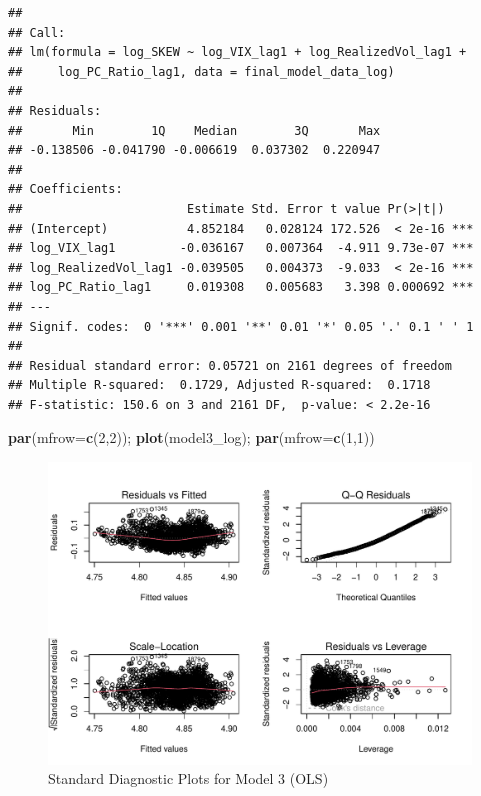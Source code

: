 \documentclass[
]{article}
\newenvironment{Shaded}{\begin{snugshade}}{\end{snugshade}}
\newcommand{\AttributeTok}[1]{\textcolor[rgb]{0.13,0.29,0.53}{#1}}
\newcommand{\DecValTok}[1]{\textcolor[rgb]{0.00,0.00,0.81}{#1}}
\newcommand{\FunctionTok}[1]{\textcolor[rgb]{0.13,0.29,0.53}{\textbf{#1}}}
\newcommand{\NormalTok}[1]{#1}
\begin{document}
\begin{verbatim}
## 
## Call:
## lm(formula = log_SKEW ~ log_VIX_lag1 + log_RealizedVol_lag1 + 
##     log_PC_Ratio_lag1, data = final_model_data_log)
## 
## Residuals:
##       Min        1Q    Median        3Q       Max 
## -0.138506 -0.041790 -0.006619  0.037302  0.220947 
## 
## Coefficients:
##                       Estimate Std. Error t value Pr(>|t|)    
## (Intercept)           4.852184   0.028124 172.526  < 2e-16 ***
## log_VIX_lag1         -0.036167   0.007364  -4.911 9.73e-07 ***
## log_RealizedVol_lag1 -0.039505   0.004373  -9.033  < 2e-16 ***
## log_PC_Ratio_lag1     0.019308   0.005683   3.398 0.000692 ***
## ---
## Signif. codes:  0 '***' 0.001 '**' 0.01 '*' 0.05 '.' 0.1 ' ' 1
## 
## Residual standard error: 0.05721 on 2161 degrees of freedom
## Multiple R-squared:  0.1729, Adjusted R-squared:  0.1718 
## F-statistic: 150.6 on 3 and 2161 DF,  p-value: < 2.2e-16
\end{verbatim}

\begin{Shaded}
\begin{Highlighting}[]
  \FunctionTok{par}\NormalTok{(}\AttributeTok{mfrow=}\FunctionTok{c}\NormalTok{(}\DecValTok{2}\NormalTok{,}\DecValTok{2}\NormalTok{)); }\FunctionTok{plot}\NormalTok{(model3\_log); }\FunctionTok{par}\NormalTok{(}\AttributeTok{mfrow=}\FunctionTok{c}\NormalTok{(}\DecValTok{1}\NormalTok{,}\DecValTok{1}\NormalTok{))}
\end{Highlighting}
\end{Shaded}

\begin{figure}
\centering
\includegraphics{FinalProject_files/figure-latex/model3-parsimonious-log-log-1.pdf}
\caption{Standard Diagnostic Plots for Model 3 (OLS)}
\end{figure}
\end{document}
